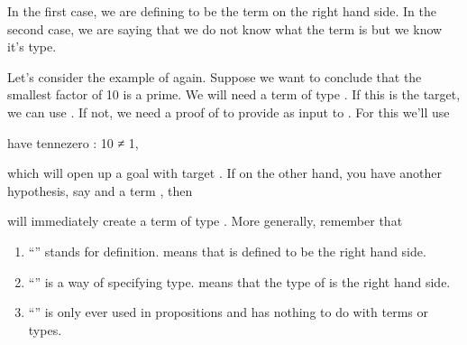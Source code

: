 \documentclass[letterpaper,10pt,english]{sphinxmanual}
\begin{document}
\begin{sphinxVerbatim}[commandchars=\\\{\}]
   
   
\end{sphinxVerbatim}

\sphinxAtStartPar
In the first case, we are defining  to be the term on the right hand side.
In the second case, we are saying that we do not know what the term  is but we know it’s type.

\sphinxAtStartPar
Let’s consider the example of  again.
Suppose we want to conclude that the smallest factor of 10 is a prime.
We will need a term of type .
If this is the target, we can use .
If not, we need a proof of  to provide as input to .
For this we’ll use

\begin{sphinxVerbatim}[commandchars=\\\{\}]
have ten\PYGZus{}ne\PYGZus{}zero : 10 ≠ 1,
\end{sphinxVerbatim}

\sphinxAtStartPar
which will open up a goal with target .
If on the other hand, you have another hypothesis, say  and a term , then

\begin{sphinxVerbatim}[commandchars=\\\{\}]
   
\end{sphinxVerbatim}

\sphinxAtStartPar
will immediately create a term of type . More generally, remember that
\begin{enumerate}
%
\item {} 
\sphinxAtStartPar
“\sphinxcode{\sphinxupquote{:=}}” stands for definition.  means that  is defined to be the right hand side.

\item {} 
\sphinxAtStartPar
“\sphinxcode{\sphinxupquote{:}}” is a way of specifying type.  means that the type of  is the right hand side.

\item {} 
\sphinxAtStartPar
“\sphinxcode{\sphinxupquote{=}}” is only ever used in propositions and has nothing to do with terms or types.

\end{enumerate}
\end{document}
